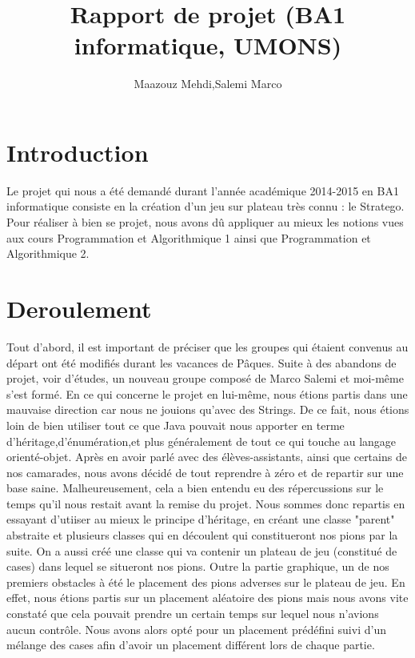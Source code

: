 \documentclass[10pt]{article}
\title{Rapport de projet (BA1 informatique, UMONS)}
\author{Maazouz Mehdi,Salemi Marco}
\begin{document}
\maketitle
\tableofcontents
\newpage

\section{Introduction}

Le projet qui nous a été demandé durant l'année académique 2014-2015 en BA1 informatique consiste en la création d'un jeu sur plateau très connu : le Stratego. Pour réaliser à bien se projet, nous avons dû appliquer au mieux les notions vues aux cours Programmation et Algorithmique 1 ainsi que Programmation et Algorithmique 2.

\section{Deroulement}

Tout d'abord, il est important de préciser que les groupes qui étaient convenus au départ ont été modifiés durant les vacances de Pâques.
Suite à des abandons de projet, voir d'études, un nouveau groupe composé de Marco Salemi et moi-même s'est formé.
En ce qui concerne le projet en lui-même, nous étions partis dans une mauvaise direction car nous ne jouions qu'avec des Strings.
De ce fait, nous étions loin de bien utiliser tout ce que Java pouvait nous apporter en terme d'héritage,d'énumération,et plus généralement de tout ce qui touche au langage orienté-objet.
Après en avoir parlé avec des élèves-assistants, ainsi que certains de nos camarades, nous avons décidé de tout reprendre à zéro et de repartir sur une base saine. Malheureusement, cela a bien entendu eu des répercussions sur le temps qu'il nous restait avant la remise du projet.
Nous sommes donc repartis en essayant d'utiiser au mieux le principe d'héritage, en créant une classe "parent" abstraite et plusieurs classes qui en découlent qui constitueront nos pions par la suite. On a aussi créé une classe qui va contenir un plateau de jeu (constitué de cases) dans lequel se situeront nos pions. Outre la partie graphique, un de nos premiers obstacles à été le placement des pions adverses sur le plateau de jeu. En effet, nous étions partis sur un placement aléatoire des pions mais nous avons vite constaté que cela pouvait prendre un certain temps sur lequel nous n'avions aucun contrôle. Nous avons alors opté pour un placement prédéfini suivi d'un mélange des cases afin d'avoir un placement différent lors de chaque partie.
\end{document}
